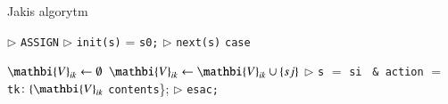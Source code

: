 \documentclass[a4paper,11p]{article}
\begin{document}
\begin{algorithm}
\caption{Jakis algorytm}

\State $\triangleright$ \verb!ASSIGN! 
\State $\triangleright$ \verb!init(s)! = \verb!s0;! 
\State $\triangleright$ \verb!next(s)! \coloneqq \verb!case!

		\State $\mathbi{V}_{ik} \gets \emptyset$
                        \State $\mathbi{V}_{ik} \gets \mathbi{V}_{ik} \cup \{sj\}$
                \EndIf
        \EndFor
                \State $\triangleright$ \verb!s! $=$ \verb!si! \verb! & action! $=$ \verb!tk!$\colon  \{\mathbi{V}_{ik}$ \verb!contents!\};
        \EndFor
\EndFor
\State $\triangleright$ \verb!esac;!


\end{algorithm}
\end{document}
